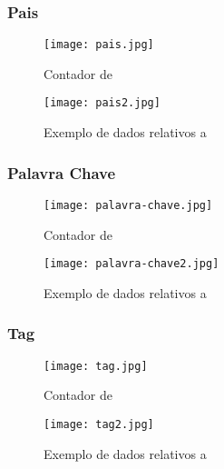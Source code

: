 \subsubsection{Pais}

\begin{figure}[H]
  \centering
  \begin{minipage}[b]{0.25\textwidth}
      \centering
      \texttt{[image: pais.jpg]}
      \caption{Contador de }
  \end{minipage}
  \hspace{0.05\textwidth}
  \begin{minipage}[b]{0.6\textwidth}
      \centering
      \texttt{[image: pais2.jpg]}
      \caption{Exemplo de dados relativos a }
  \end{minipage}
\end{figure}

\subsubsection{Palavra Chave}

\begin{figure}[H]
  \centering
  \begin{minipage}[b]{0.25\textwidth}
      \centering
      \texttt{[image: palavra-chave.jpg]}
      \caption{Contador de }
  \end{minipage}
  \hspace{0.05\textwidth}
  \begin{minipage}[b]{0.6\textwidth}
      \centering
      \texttt{[image: palavra-chave2.jpg]}
      \caption{Exemplo de dados relativos a }
  \end{minipage}
\end{figure}

\subsubsection{Tag}

\begin{figure}[H]
  \centering
  \begin{minipage}[b]{0.25\textwidth}
      \centering
      \texttt{[image: tag.jpg]}
      \caption{Contador de }
  \end{minipage}
  \hspace{0.05\textwidth}
  \begin{minipage}[b]{0.6\textwidth}
      \centering
      \texttt{[image: tag2.jpg]}
      \caption{Exemplo de dados relativos a }
  \end{minipage}
\end{figure}

